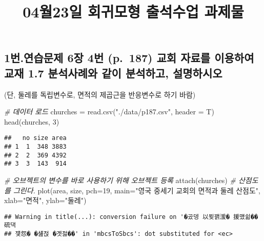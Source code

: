 \documentclass[
]{article}
\title{04월23일 회귀모형 출석수업 과제물}
\author{}
\date{\vspace{-2.5em}}
\newenvironment{Shaded}{\begin{snugshade}}{\end{snugshade}}
\newcommand{\AttributeTok}[1]{\textcolor[rgb]{0.77,0.63,0.00}{#1}}
\newcommand{\CommentTok}[1]{\textcolor[rgb]{0.56,0.35,0.01}{\textit{#1}}}
\newcommand{\DecValTok}[1]{\textcolor[rgb]{0.00,0.00,0.81}{#1}}
\newcommand{\FunctionTok}[1]{\textcolor[rgb]{0.00,0.00,0.00}{#1}}
\newcommand{\NormalTok}[1]{#1}
\newcommand{\OtherTok}[1]{\textcolor[rgb]{0.56,0.35,0.01}{#1}}
\newcommand{\StringTok}[1]{\textcolor[rgb]{0.31,0.60,0.02}{#1}}
\begin{document}
\maketitle

\hypertarget{uxbc88.uxc5f0uxc2b5uxbb38uxc81c-6uxc7a5-4uxbc88-p.-187-uxad50uxd68c-uxc790uxb8ccuxb97c-uxc774uxc6a9uxd558uxc5ec-uxad50uxc7ac-1.7-uxbd84uxc11duxc0acuxb840uxc640-uxac19uxc774-uxbd84uxc11duxd558uxace0-uxc124uxba85uxd558uxc2dcuxc624}{%
\subsection{1번.연습문제 6장 4번 (p.~187) 교회 자료를 이용하여 교재 1.7
분석사례와 같이 분석하고,
설명하시오}\label{uxbc88.uxc5f0uxc2b5uxbb38uxc81c-6uxc7a5-4uxbc88-p.-187-uxad50uxd68c-uxc790uxb8ccuxb97c-uxc774uxc6a9uxd558uxc5ec-uxad50uxc7ac-1.7-uxbd84uxc11duxc0acuxb840uxc640-uxac19uxc774-uxbd84uxc11duxd558uxace0-uxc124uxba85uxd558uxc2dcuxc624}}

(단, 둘레를 독립변수로, 면적의 제곱근을 반응변수로 하기 바람)

\begin{Shaded}
\begin{Highlighting}[]
\CommentTok{\# 데이터 로드}
\NormalTok{churches }\OtherTok{=} \FunctionTok{read.csv}\NormalTok{(}\StringTok{"./data/p187.csv"}\NormalTok{, }\AttributeTok{header =}\NormalTok{ T)}
\FunctionTok{head}\NormalTok{(churches, }\DecValTok{3}\NormalTok{)}
\end{Highlighting}
\end{Shaded}

\begin{verbatim}
##   no size area
## 1  1  348 3883
## 2  2  369 4392
## 3  3  143  914
\end{verbatim}

\begin{Shaded}
\begin{Highlighting}[]
\CommentTok{\# 오브젝트의 변수를 바로 사용하기 위해 오브젝트 등록}
\FunctionTok{attach}\NormalTok{(churches)}
\CommentTok{\# 산점도를 그린다.}
\FunctionTok{plot}\NormalTok{(area, size, }\AttributeTok{pch=}\DecValTok{19}\NormalTok{, }\AttributeTok{main=}\StringTok{"영국 중세기 교회의 면적과 둘레 산점도"}\NormalTok{, }\AttributeTok{xlab=}\StringTok{"면적"}\NormalTok{, }\AttributeTok{ylab=}\StringTok{"둘레"}\NormalTok{)}
\end{Highlighting}
\end{Shaded}

\begin{verbatim}
## Warning in title(...): conversion failure on '�곴뎅 以묒꽭湲� 援먰쉶�� 硫댁
## 쟻怨� �섎젅 �곗젏��' in 'mbcsToSbcs': dot substituted for <ec>
\end{verbatim}
\end{document}
